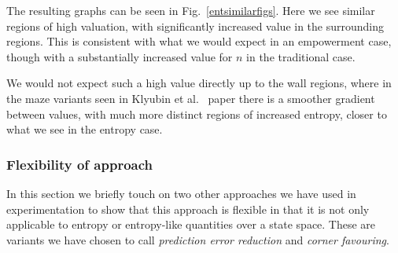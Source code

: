 \documentclass{article}
\begin{document}

The resulting graphs can be seen in Fig.~\ref{entsimilarfigs}. Here we see similar regions of high valuation, with significantly increased value in the surrounding regions. This is consistent with what we would expect in an empowerment case, though with a substantially increased value for $n$ in the traditional case. 

We would not expect such a high value directly up to the wall regions, where in the maze variants seen in Klyubin et al.~\citep{klyubin2005empowerment} paper there is a smoother gradient between values, with much more distinct regions of increased entropy, closer to what we see in the entropy case.

\subsubsection{Flexibility of approach}
In this section we briefly touch on two other approaches we have used in experimentation to show that this approach is flexible in that it is not only applicable to entropy or entropy-like quantities over a state space. These are variants we have chosen to call \emph{prediction error reduction} and \emph{corner favouring}.
\end{document}
